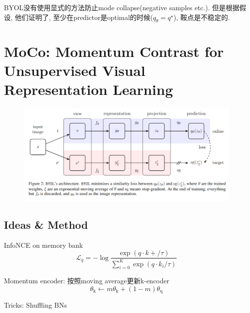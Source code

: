 \documentclass{article}
\begin{document}
BYOL没有使用显式的方法防止mode collapse(negative samples etc.). 但是根据假设, 他们证明了, 至少在predictor是optimal的时候($q_\theta = q^\star$), 鞍点是不稳定的.

\section{MoCo: Momentum Contrast for Unsupervised Visual Representation Learning}
\begin{figure}[htbp]
    \centering
    \includegraphics[width=\textwidth]{byol-fig.png}
\end{figure}
\subsection{Ideas \& Method}

InfoNCE on memory bank
\begin{equation}
    \mathcal{L}_{q}=-\log \frac{\exp (q \cdot k+/ \tau)}{\sum_{i=0}^{K} \exp \left(q \cdot k_{i} / \tau\right)}
\end{equation}

Momentum encoder: 按照moving average更新k-encoder
\begin{equation}
    \theta_{\mathrm{k}} \leftarrow m \theta_{\mathrm{k}}+(1-m) \theta_{\mathrm{q}}
\end{equation}

Tricks: Shuffling BNs
\end{document}
